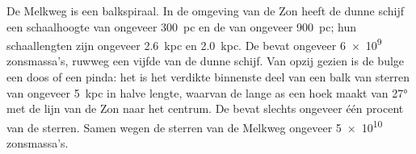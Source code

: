 De Melkweg is een balkspiraal. In de omgeving van de Zon heeft de dunne
schijf een schaalhoogte van ongeveer \qty{300}{pc} en de  van
ongeveer \qty{900}{pc}; hun schaallengten zijn ongeveer \qty{2.6}{kpc} en
\qty{2.0}{kpc}. De  bevat ongeveer \num{6e9} zonsmassa's,
ruwweg een vijfde van de dunne schijf. Van opzij gezien is de bulge een doos
of een pinda: het is het verdikte binnenste deel van een balk van sterren van ongeveer
\qty{5}{kpc} in halve lengte, waarvan de lange as een hoek maakt van
\ang{27} met de lijn van de Zon naar het centrum. De  bevat
slechts ongeveer één procent van de sterren. Samen wegen de sterren van de Melkweg
ongeveer \num{5e10} zonsmassa's.

